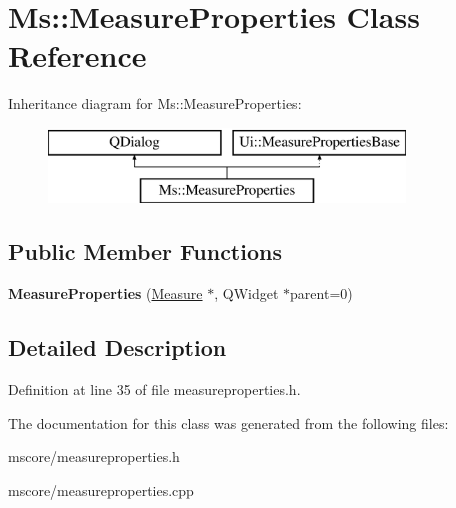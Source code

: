 \hypertarget{class_ms_1_1_measure_properties}{}\section{Ms\+:\+:Measure\+Properties Class Reference}
\label{class_ms_1_1_measure_properties}
Inheritance diagram for Ms\+:\+:Measure\+Properties\+:\begin{figure}[H]
\begin{center}
\leavevmode
\includegraphics[height=2.000000cm]{class_ms_1_1_measure_properties}
\end{center}
\end{figure}
\subsection*{Public Member Functions}
\begin{DoxyCompactItemize}
\item 
\mbox{\label{class_ms_1_1_measure_properties_a9f6f42e927e53b921474c1e50b4e3b4c}} 
{\bfseries Measure\+Properties} (\hyperlink{class_ms_1_1_measure}{Measure} $\ast$, Q\+Widget $\ast$parent=0)
\end{DoxyCompactItemize}


\subsection{Detailed Description}


Definition at line 35 of file measureproperties.\+h.



The documentation for this class was generated from the following files\+:\begin{DoxyCompactItemize}
\item 
mscore/measureproperties.\+h\item 
mscore/measureproperties.\+cpp\end{DoxyCompactItemize}
